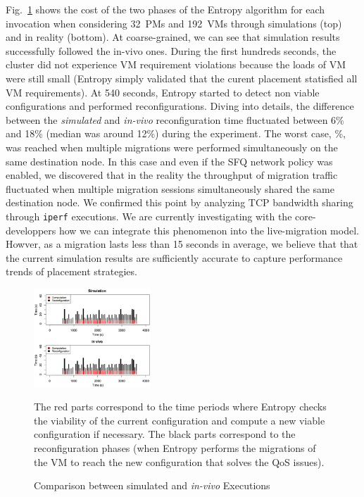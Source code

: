Fig.~\ref{fig:usecase-vivosimu} shows the cost of the two phases of
the Entropy algorithm for each invocation when considering 32~PMs and
192~VMs through simulations (top) and in reality (bottom). At
coarse-grained, we can see that simulation results successfully
followed the in-vivo ones. During the first hundreds seconds, the cluster did not
experience VM requirement violations because the loads of VM were
still small (\ie Entropy simply validated that the curent placement
statisfied all VM requirements). At 540 seconds, Entropy started to
detect non viable configurations and performed reconfigurations.
Diving into details, the difference between the \textit{simulated} and
\textit{in-vivo} reconfiguration time fluctuated between 6\% and 18\%
(median was around 12\%) during the experiment. The worst case, \%, was reached when
multiple migrations were performed simultaneously on the same
destination node. In this case and even if the SFQ network policy was
enabled, we discovered that in the reality the throughput of migration
traffic fluctuated when multiple migration sessions simultaneously
shared the same destination node. We confirmed this point by analyzing
TCP bandwidth sharing through \texttt{iperf} executions. We are
currently investigating with the \sg core-developpers how we can
integrate this phenomenon into the live-migration model. Howver, as a
migration lasts less than 15 seconds in average, we believe that that
the current simulation results are sufficiently accurate to capture
performance trends of placement strategies.

\begin{figure}[hbt]
\centering
\includegraphics[width=0.39\textwidth]{./figures/simu-vivo-32PM-192VM-6020.png}
\caption{Comparison between simulated and \textit{in-vivo} Executions}
\flushleft\scriptsize{The red parts correspond to the time periods where Entropy checks the viability
of the current configuration and compute a new viable configuration if necessary.
The black parts correspond to the reconfiguration phases (\ie when
Entropy performs the migrations of the VM to reach the new
configuration that solves the QoS issues).}
\label{fig:usecase-vivosimu}
\end{figure}


